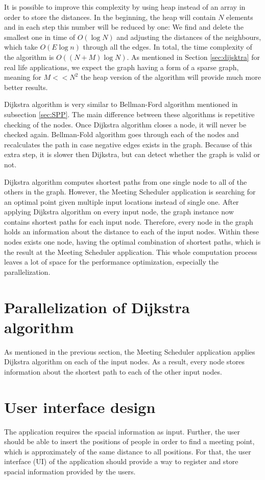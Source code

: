 \documentclass[thesis=M,english]{FITthesis}[2012/10/20]
\begin{document}
It is possible to improve this complexity by using heap instead of an array in order to store the distances. In the beginning, the heap will contain $N$ elements and in each step this number will be reduced by one: We find and delete the smallest one in time of $O(\log{N})$ and adjusting the distances of the neighbours, which take $O(E\log{n})$ through all the edges. In total, the time complexity of the algorithm is $O((N+M) \log{N})$. As mentioned in Section \ref{sec:dijsktra} for real life applications, we expect the graph having a form of a sparse graph, meaning for $M << N^2$ the heap version of the algorithm will provide much more better results.


Dijkstra algorithm is very similar to Bellman-Ford algorithm mentioned in subsection \ref{sec:SPP}. The main difference between these algorithms is repetitive checking of the nodes. Once Dijkstra algorithm closes a node, it will never be checked again. Bellman-Fold algorithm goes through each of the nodes and recalculates the path in case negative edges exists in the graph. Because of this extra step, it is slower then Dijkstra, but can detect whether the graph is valid or not.

Dijkstra algorithm computes shortest paths from one single node to all of the others in the graph. However, the Meeting Scheduler application is searching for an optimal point given multiple input locations instead of single one. After applying Dijkstra algorithm on every input node, the graph instance now contains shortest paths for each input node. Therefore, every node in the graph holds an information about the distance to each of the input nodes. Within these nodes exists one node, having the optimal combination of shortest paths, which is the result at the Meeting Scheduler application.
This whole computation process leaves a lot of space for the performance optimization, especially the parallelization. 

\section{Parallelization of Dijkstra algorithm}
As mentioned in the previous section, the Meeting Scheduler application applies Dijkstra algorithm on each of the input nodes. As a result, every node stores information about the shortest path to each of the other input nodes. 

\section{User interface design}
\label{sec:UIDesign}
The application requires the spacial information as input. 
Further, the user should be able to insert the positions of people in order to find a meeting point, which is approximately of the same distance to all positions. For that, the user interface (UI) of the application should provide a way to register and store spacial information provided by the users. 
\end{document}
